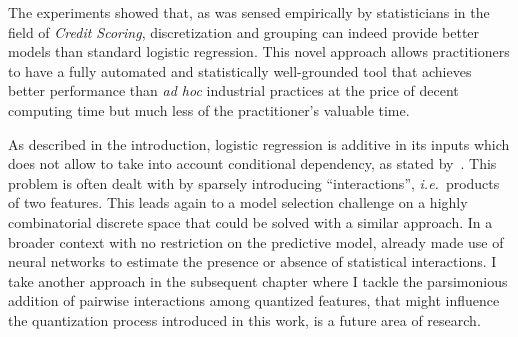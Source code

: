 The experiments showed that, as was sensed empirically by statisticians in the field of \textit{Credit Scoring}, discretization and grouping can indeed provide better models than standard logistic regression. This novel approach allows practitioners to have a fully automated and statistically well-grounded tool that achieves better performance than \textit{ad hoc} industrial practices at the price of decent computing time but much less of the practitioner's valuable time.

As described in the introduction, logistic regression is additive in its inputs which does not allow to take into account conditional dependency, as stated by~\cite{berry2010testing}. This problem is often dealt with by sparsely introducing ``interactions'', \textit{i.e.}\ products of two features. This leads again to a model selection challenge on a highly combinatorial discrete space that could be solved with a similar approach. In a broader context with no restriction on the predictive model, \cite{tsang2018detecting} already made use of neural networks to estimate the presence or absence of statistical interactions. I take another approach in the subsequent chapter where I tackle the parsimonious addition of pairwise interactions among quantized features, that might influence the quantization process introduced in this work, is a future area of research.




\printbibliography[heading=subbibliography, title=Références du chapitre 3]

